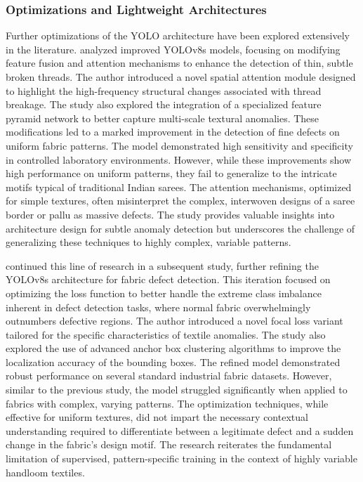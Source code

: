 \documentclass{ieeeaccess}
\begin{document}
\subsubsection{Optimizations and Lightweight Architectures}

Further optimizations of the YOLO architecture have been explored extensively in the literature. \cite{b5} analyzed improved YOLOv8s models, focusing on modifying feature fusion and attention mechanisms to enhance the detection of thin, subtle broken threads. The author introduced a novel spatial attention module designed to highlight the high-frequency structural changes associated with thread breakage. The study also explored the integration of a specialized feature pyramid network to better capture multi-scale textural anomalies. These modifications led to a marked improvement in the detection of fine defects on uniform fabric patterns. The model demonstrated high sensitivity and specificity in controlled laboratory environments. However, while these improvements show high performance on uniform patterns, they fail to generalize to the intricate motifs typical of traditional Indian sarees. The attention mechanisms, optimized for simple textures, often misinterpret the complex, interwoven designs of a saree border or pallu as massive defects. The study provides valuable insights into architecture design for subtle anomaly detection but underscores the challenge of generalizing these techniques to highly complex, variable patterns.

\cite{b6} continued this line of research in a subsequent study, further refining the YOLOv8s architecture for fabric defect detection. This iteration focused on optimizing the loss function to better handle the extreme class imbalance inherent in defect detection tasks, where normal fabric overwhelmingly outnumbers defective regions. The author introduced a novel focal loss variant tailored for the specific characteristics of textile anomalies. The study also explored the use of advanced anchor box clustering algorithms to improve the localization accuracy of the bounding boxes. The refined model demonstrated robust performance on several standard industrial fabric datasets. However, similar to the previous study, the model struggled significantly when applied to fabrics with complex, varying patterns. The optimization techniques, while effective for uniform textures, did not impart the necessary contextual understanding required to differentiate between a legitimate defect and a sudden change in the fabric's design motif. The research reiterates the fundamental limitation of supervised, pattern-specific training in the context of highly variable handloom textiles.
\end{document}
